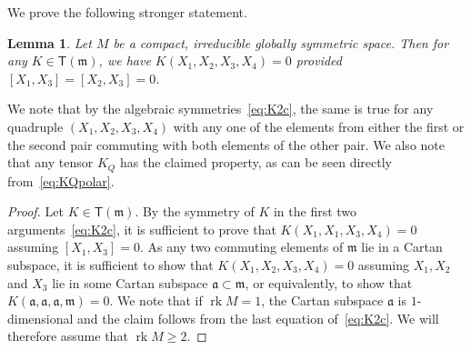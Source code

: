 \documentclass[12pt,reqno]{amsart}
\newcommand \rk{\operatorname{rk}}
\newcommand \sT{\mathsf{T}}
\newcommand\ag{\mathfrak a}
\newcommand\m{\mathfrak m}
\newcommand \<{\langle}
\renewcommand \>{\rangle}
\newtheorem{lemma}{Lemma}
\theoremstyle{definition}
\theoremstyle{remark}
\begin{document}
We prove the following stronger statement.

	\begin{lemma} \label{l:threecommute}
		Let $M$ be a compact, irreducible globally symmetric space. Then for any $K \in \sT(\m)$, we have $K(X_1,X_2,X_3,X_4) = 0$ provided $[X_1,X_3]=[X_2,X_3] =0$.
	\end{lemma}
	We note that by the algebraic symmetries~\eqref{eq:K2c}, the same is true for any quadruple $(X_1,X_2,X_3,X_4)$ with any one of the elements from either the first or the second pair commuting with both elements of the other pair. We also note that any tensor $K_Q$ has the claimed property, as can be seen directly from~\eqref{eq:KQpolar}.

	\begin{proof}
		Let $K \in \sT(\m)$. By the symmetry of $K$ in the first two arguments~\eqref{eq:K2c}, it is sufficient to prove that $K(X_1,X_1,X_3,X_4) = 0$ assuming $[X_1,X_3]=0$. As any two commuting elements of $\m$ lie in a Cartan subspace, it is sufficient to show that $K(X_1,X_2,X_3,X_4) = 0$ assuming $X_1,X_2$ and $X_3$ lie in some Cartan subspace $\ag \subset \m$, or equivalently, to show that $K(\ag,\ag,\ag,\m) = 0$. We note that if $\rk M =1$, the Cartan subspace $\ag$ is $1$-dimensional and the claim follows from the last equation of~\eqref{eq:K2c}. We will therefore assume that $\rk M \ge 2$. %
		

\end{proof}
\end{document}
